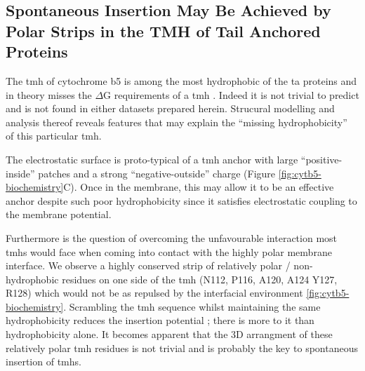 
\subsection{Spontaneous Insertion May Be Achieved by Polar Strips in the TMH of Tail Anchored Proteins}

The \gls{tmh} of cytochrome b5 is among the most hydrophobic of the \gls{ta} proteins and in theory misses the $\Delta$G requirements of a \gls{tmh} \cite{Rabu2008, Rabu2009}.
Indeed it is not trivial to predict and is not found in either datasets prepared herein.
Strucural modelling and analysis thereof reveals features that may explain the ``missing hydrophobicity''~\cite{Hessa2005, Hedin2010, Hessa2007, Ojemalm2012} of this particular \gls{tmh}.

The electrostatic surface is proto-typical of a \gls{tmh} anchor with large ``positive-inside'' patches \cite{VonHeijne1989, Andersson1992, Sharpe2010, Baeza-Delgado2013, Pogozheva2013, Baker2017} and a strong ``negative-outside'' charge \cite{Baker2017}(Figure \ref{fig:cytb5-biochemistry}C).
Once in the membrane, this may allow it to be an effective anchor despite such poor hydrophobicity since it satisfies electrostatic coupling to the membrane potential.

Furthermore is the question of overcoming the unfavourable interaction most \gls{tmh}s would face when coming into contact with the highly polar membrane interface.
We observe a highly conserved strip of relatively polar / non-hydrophobic residues on one side of the \gls{tmh} (N112, P116, A120, A124 Y127, R128) which would not be as repulsed by the interfacial environment \ref{fig:cytb5-biochemistry}.
Scrambling the \gls{tmh} sequence whilst maintaining the same hydrophobicity reduces the insertion potential \cite{Brambillasca2006}; there is more to it than hydrophobicity alone.
It becomes apparent that the 3D arrangment of these relatively polar \gls{tmh} residues is not trivial and is probably the key to spontaneous insertion of \gls{tmh}s.

